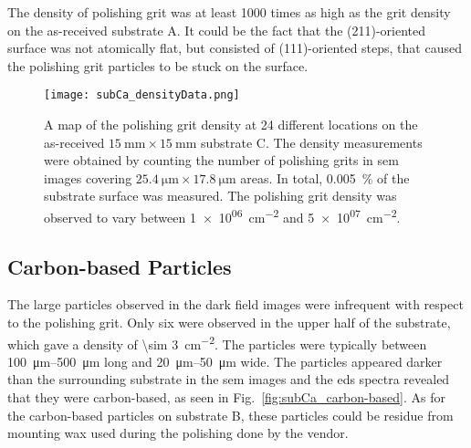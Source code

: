 The density of polishing grit was at least 1000 times as high as the grit density on the as-received substrate A. It could be the fact that the (211)-oriented surface was not atomically flat, but consisted of (111)-oriented steps, that caused the polishing grit particles to be stuck on the surface.

\begin{figure}[htbp]
    \centering
    \texttt{[image: subCa\_densityData.png]}
    \caption[Map of the polishing grit density on the as-received substrate C.]{A map of the polishing grit density at 24 different locations on the as-received $\SI{15}{\milli\metre}\times\SI{15}{\milli\metre}$ substrate C. The density measurements were obtained by counting the number of polishing grits in \ac{sem} images covering $\SI{25.4}{\micro\metre}\times\SI{17.8}{\micro\metre}$ areas. In total, \SI{0.005}{\percent} of the substrate surface was measured. The polishing grit density was observed to vary between \SI{1e+06}{\centi\metre^{-2}} and \SI{5e+07}{\centi\metre^{-2}}.}
    \label{fig:subCa_densityData}
\end{figure}

\subsection{Carbon-based Particles}

The large particles observed in the dark field images were infrequent with respect to the polishing grit. Only six were observed in the upper half of the substrate, which gave a density of \SI{\sim 3}{\centi\metre^{-2}}. The particles were typically between \SIrange{100}{500}{\micro\metre} long and \SIrange{20}{50}{\micro\metre} wide. The particles appeared darker than the surrounding substrate in the \ac{sem} images and the \ac{eds} spectra revealed that they were carbon-based, as seen in Fig.~\ref{fig:subCa_carbon-based}. As for the carbon-based particles on substrate B, these particles could be residue from mounting wax used during the polishing done by the vendor.

